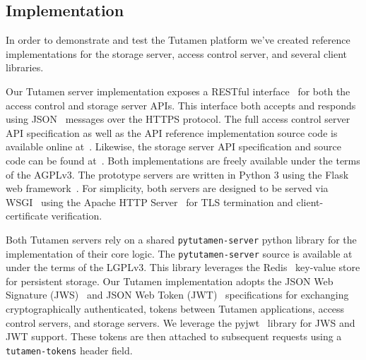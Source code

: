 \subsection{Implementation}

In order to demonstrate and test the Tutamen platform we've created
reference implementations for the storage server, access control
server, and several client libraries.

Our Tutamen server implementation exposes a RESTful
interface~\cite{fielding2000} for both the access control and storage
server APIs. This interface both accepts and responds using
JSON~\cite{json} messages over the HTTPS protocol. The full access
control server API specification as well as the API reference
implementation source code is available online
at~\cite{src-tutamen-apiaccesscontrol}. Likewise, the storage server
API specification and source code can be found
at~\cite{src-tutamen-apistorage}. Both implementations are freely
available under the terms of the AGPLv3. The prototype servers are
written in Python 3 using the Flask web
framework~\cite{python-flask}. For simplicity, both servers are
designed to be served via WSGI~\cite{pep3333} using the Apache HTTP
Server~\cite{apache} for TLS termination and client-certificate
verification.

Both Tutamen servers rely on a shared \texttt{pytutamen-server} python
library for the implementation of their core logic. The
\texttt{pytutamen-server} source is available
at~\cite{src-tutamen-pytutamenserver} under the terms of the
LGPLv3. This library leverages the Redis~\cite{redis} key-value store
for persistent storage. Our Tutamen implementation adopts the JSON Web
Signature (JWS)~\cite{rfc7515} and JSON Web Token (JWT)~\cite{rfc7519}
specifications for exchanging cryptographically authenticated, tokens
between Tutamen applications, access control servers, and storage
servers. We leverage the pyjwt~\cite{pyjwt} library for JWS and JWT
support. These tokens are then attached to subsequent requests using a
\texttt{tutamen-tokens} header field.

